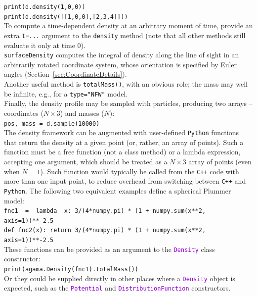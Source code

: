 \documentclass[12pt]{article}
\newcommand{\Cpp}  {\texttt{C++}\xspace}
\newcommand{\Python}{\texttt{Python}\xspace}
\newcommand{\ttt}[1]{\textcolor{darkviolet}{\texttt{#1}}}
\newcommand{\ppp}[1]{\textcolor{darkolive} {\texttt{#1}}}
\begin{document}
\texttt{print(d.density(1,0,0))}\\
\texttt{print(d.density([[1,0,0],[2,3,4]]))}\\
To compute a time-dependent density at an arbitrary moment of time, provide an extra \texttt{t=...} argument to the \texttt{density} method (note that all other methods still evaluate it only at time 0).\\[2mm]
\texttt{surfaceDensity} computes the integral of density along the line of sight in an arbitrarily rotated coordinate system, whose orientation is specified by Euler angles (Section~\ref{sec:CoordinateDetails}).\\[1mm]
Another useful method is \texttt{totalMass()}, with an obvious role; the mass may well be infinite, e.g., for a \ppp{type="NFW"} model.\\[1mm]
Finally, the density profile may be sampled with particles, producing two arrays -- coordinates ($N\times3$) and masses ($N$): \\
\texttt{pos, mass = d.sample(10000)}\\[2mm]
The density framework can be augmented with user-defined \Python functions that return the density at a given point (or, rather, an array of points). Such a function must be a free function (not a class method) or a lambda expression, accepting one argument, which should be treated as a $N\times3$ array of points (even when $N=1$). Such function would typically be called from the \Cpp code with more than one input point, to reduce overhead from switching between \Cpp and \Python. The following two equivalent examples define a spherical Plummer model:\\
\texttt{fnc1~~=~~lambda~~x:  3/(4*numpy.pi) * (1 + numpy.sum(x**2, axis=1))**-2.5}\\
\texttt{def fnc2(x):  return 3/(4*numpy.pi) * (1 + numpy.sum(x**2, axis=1))**-2.5}\\
These functions can be provided as an argument to the \ttt{Density} class constructor:\\
\texttt{print(agama.Density(fnc1).totalMass())}\\
Or they could be supplied directly in other places where a \ttt{Density} object is expected, such as the \ttt{Potential} and \ttt{DistributionFunction} constructors.
\end{document}
